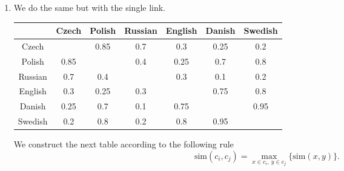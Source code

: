 \documentclass[fontsize=12pt, usenames, dvipsnames, headinclude, headsepline, footinclude, footsepline]{scrartcl}
\begin{document}
\begin{sol}
\begin{enumerate}
      \begin{center}
      \end{center}


    \item We do the same but with the single link. 

      \begin{center}
        \begin{tabular}{@{}c|cccccc@{}}
          \toprule
          & Czech & Polish & Russian & English & Danish & Swedish \\ \midrule
          Czech   &       & 0.85   & 0.7     & 0.3     & 0.25   & 0.2     \\
          Polish  & 0.85  &        & 0.4     & 0.25    & 0.7    & 0.8     \\
          Russian & 0.7   & 0.4    &         & 0.3     & 0.1    & 0.2     \\
          English & 0.3   & 0.25   & 0.3     &         & 0.75   & 0.8     \\
          Danish  & 0.25  & 0.7    & 0.1     & 0.75    &        & \cellcolor{ForestGreen!30}0.95    \\
          Swedish & 0.2   & 0.8    & 0.2     & 0.8     & 0.95   &         \\ \bottomrule
        \end{tabular}
      \end{center}

      We construct the next table according to the following rule 
      \[ \mathrm{sim}(c_i, c_j) = \max_{x \in c_i,\ y \in c_j}\{\mathrm{sim}(x, y)\}. \]


\end{enumerate}
\end{sol}
\end{document}
